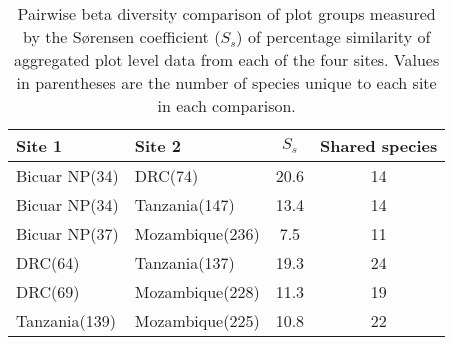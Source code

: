 \begin{table}[!htbp]
	\caption[Pairwise S\o{}rensen coefficient of similarity among sites]{Pairwise beta diversity comparison of plot groups measured by the S\o{}rensen coefficient ($S_s$) of percentage similarity of aggregated plot level data from each of the four sites. Values in parentheses are the number of species unique to each site in each comparison.} 
	\label{bicuar:site_pairs_js} 
	\begin{tabular}{llS[table-format=2.1]S[table-format=2.0]} 
\toprule
{Site 1} & {Site 2} & {$S_s$} & {Shared species} \\
\midrule
Bicuar NP(34) & DRC(74) & 20.6 & 14 \\ 
Bicuar NP(34) & Tanzania(147) & 13.4 & 14 \\ 
Bicuar NP(37) & Mozambique(236) & 7.5 & 11 \\ 
DRC(64) & Tanzania(137) & 19.3 & 24 \\ 
DRC(69) & Mozambique(228) & 11.3 & 19 \\ 
Tanzania(139) & Mozambique(225) & 10.8 & 22 \\ 
\bottomrule
\end{tabular} 
\end{table} 
